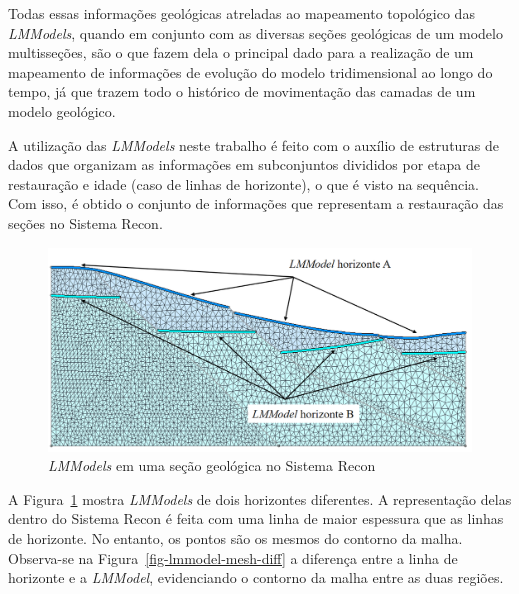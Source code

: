 Todas essas informações  geológicas atreladas ao mapeamento topológico das \textit{LMModels}, quando em conjunto com as diversas seções geológicas de um modelo multisseções, são o que fazem dela o principal dado para a realização de um mapeamento de informações de evolução do modelo tridimensional ao longo do tempo, já que trazem todo o histórico de movimentação das camadas de um modelo geológico.

A utilização das \emph{LMModels} neste trabalho é feito com o auxílio de estruturas de dados que organizam as informações em subconjuntos divididos por etapa de restauração e idade (caso de linhas de horizonte), o que é visto na sequência. Com isso, é obtido o conjunto de informações que representam a restauração das seções no Sistema Recon.

\begin{figure} [h]
  \begin{center}
    \includegraphics[width=350pt]{images/fig-lmmodel-example}
    \caption{\textit{LMModels} em uma seção geológica no Sistema Recon}\label{fig-lmmodel-example}
  \end{center}
\end{figure}

A Figura~\ref{fig-lmmodel-example} mostra \textit{LMModels} de dois horizontes diferentes. A representação delas dentro do Sistema Recon é feita com uma linha de maior espessura que as linhas de horizonte. No entanto, os pontos são os mesmos do contorno da malha. Observa-se na Figura~\ref{fig-lmmodel-mesh-diff} a diferença entre a linha de horizonte e a \textit{LMModel}, evidenciando o contorno da malha entre as duas regiões.


